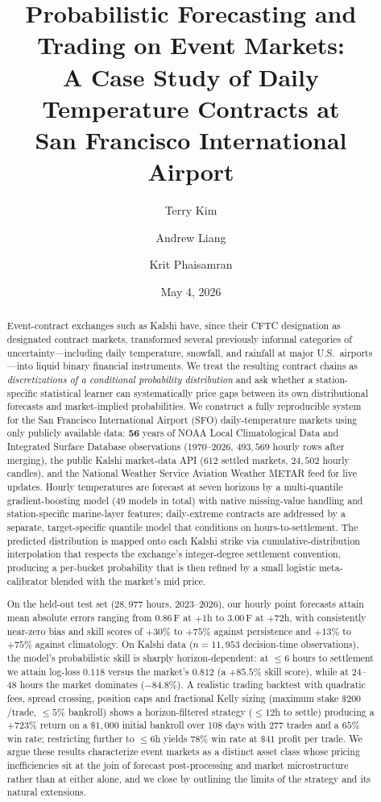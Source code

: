 \documentclass[11pt]{article}
\title{Probabilistic Forecasting and Trading on Event Markets:\\
A Case Study of Daily Temperature Contracts at\\
San Francisco International Airport}
\author[1,*]{Terry Kim}
\author[1]{Andrew Liang}
\author[1]{Krit Phaisamran}
\affil[1]{Department of Computer Science, Stanford University, Stanford, CA, USA}
\affil[*]{Corresponding author: \href{mailto:tkim219@stanford.edu}{tkim219@stanford.edu}}
\date{May 4, 2026}
\begin{document}
\maketitle

\begin{abstract}
Event-contract exchanges such as Kalshi have, since their CFTC designation as
designated contract markets, transformed several previously informal categories of
uncertainty---including daily temperature, snowfall, and rainfall at major U.S.\ airports---into
liquid binary financial instruments. We treat the resulting contract chains as
\emph{discretizations of a conditional probability distribution} and ask whether a
station-specific statistical learner can systematically price gaps between its own
distributional forecasts and market-implied probabilities. We construct a fully
reproducible system for the San Francisco International Airport (SFO) daily-temperature
markets using only publicly available data: $\mathbf{56}$ years of NOAA Local
Climatological Data and Integrated Surface Database observations (1970--2026,
$493{,}569$ hourly rows after merging), the public Kalshi market-data API
($612$ settled markets, $24{,}502$ hourly candles), and the
National Weather Service Aviation Weather METAR feed for live updates. Hourly temperatures
are forecast at seven horizons by a multi-quantile gradient-boosting model
($49$ models in total) with native missing-value handling and station-specific
marine-layer features; daily-extreme contracts are addressed by a separate,
target-specific quantile model that conditions on hours-to-settlement.
The predicted distribution is mapped onto each Kalshi strike via cumulative-distribution
interpolation that respects the exchange's integer-degree settlement convention,
producing a per-bucket probability that is then refined by a small logistic
meta-calibrator blended with the market's mid price.

On the held-out test set ($28{,}977$ hours, 2023--2026), our hourly point forecasts
attain mean absolute errors ranging from $\mathbf{0.86}$\,\textdegree F at $+1$h to
$\mathbf{3.00}$\,\textdegree F at $+72$h, with consistently
near-zero bias and skill scores of $+30\%$ to $+75\%$ against persistence and
$+13\%$ to $+75\%$ against climatology. On Kalshi data ($n=11{,}953$
decision-time observations), the model's probabilistic skill is sharply
horizon-dependent: at $\le 6$ hours to settlement we attain log-loss $0.118$
versus the market's $0.812$ (a $+85.5\%$ skill score), while at $24$--$48$ hours
the market dominates ($-84.8\%$). A realistic trading backtest with quadratic
fees, spread crossing, position caps and fractional Kelly sizing
(maximum stake $\$200$/trade, $\le 5\%$ bankroll) shows a horizon-filtered
strategy ($\le 12$h to settle) producing a $+723\%$ return on a $\$1{,}000$
initial bankroll over $108$ days with $277$ trades and a $65\%$ win rate;
restricting further to $\le 6$h yields $78\%$ win rate at $\$41$ profit per
trade. We argue these results characterize event markets as a distinct asset
class whose pricing inefficiencies sit at the join of forecast post-processing
and market microstructure rather than at either alone, and we close by outlining
the limits of the strategy and its natural extensions.
\end{abstract}
\end{document}
